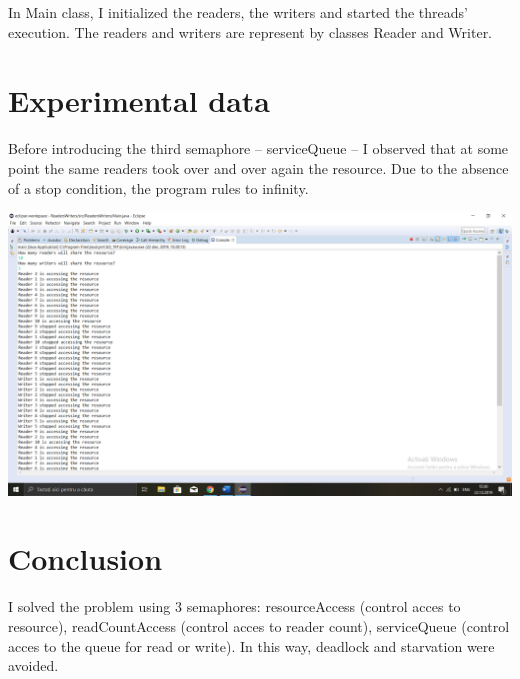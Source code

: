 \documentclass{article}
\begin{document}
\hspace{0.5 cm}
In Main class, I initialized the readers, the writers and started the threads' execution. The readers and writers are  represent by classes Reader and Writer.

\section{Experimental data}
\hspace{0.5 cm}
Before introducing the third semaphore – serviceQueue – I observed that at some point the same readers took over and over again the resource.
Due to the absence of a stop condition, the program rules to infinity.

\includegraphics{RW.png}

\section{Conclusion}
\hspace{0.5 cm}
I solved the problem using 3 semaphores: resourceAccess (control acces to resource), readCountAccess (control acces to reader count), serviceQueue (control acces to the queue for read or write). In this way, deadlock and starvation were avoided.
\end{document}
